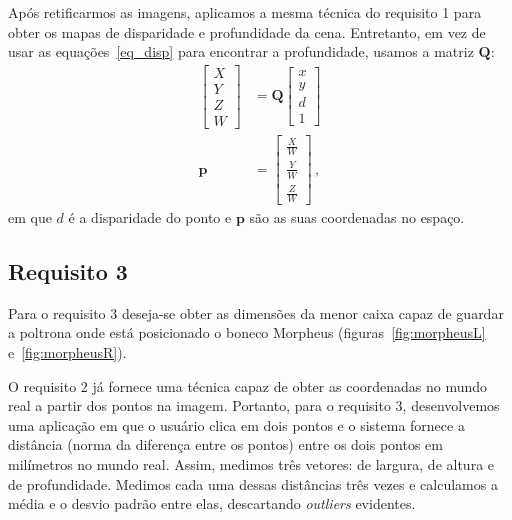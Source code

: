 \documentclass{bmvc2k}
\begin{document}
Após retificarmos as imagens, aplicamos a mesma técnica do requisito 1 para obter os mapas de disparidade e profundidade da cena. Entretanto, em vez de usar as equações~\ref{eq_disp} para encontrar a profundidade, usamos a matriz $\mathbf{Q}$:
\begin{subequations}
    \begin{align}
    \begin{bmatrix}
    X \\
    Y  \\
    Z \\
    W
    \end{bmatrix}
    &=
    \mathbf{Q}\begin{bmatrix}
    x \\
    y  \\
    d\\
    1
    \end{bmatrix}\\
    \bm{p} &= \begin{bmatrix}
    \frac{X}{W} \\
    \frac{Y}{W}  \\
    \frac{Z}{W} 
    \end{bmatrix}\,,
    \end{align}
\end{subequations}
em que $d$ é a disparidade do ponto e $\bm{p}$ são as suas coordenadas no espaço.

\subsection{Requisito 3}
\label{met3}
Para o requisito 3 deseja-se obter as dimensões da menor caixa capaz de guardar a poltrona onde está posicionado o boneco Morpheus (figuras~\ref{fig:morpheusL} e~\ref{fig:morpheusR}).

O requisito 2 já fornece uma técnica capaz de obter as coordenadas no mundo real a partir dos pontos na imagem. Portanto, para o requisito 3, desenvolvemos uma aplicação em que o usuário clica em dois pontos e o sistema fornece a distância (norma da diferença entre os pontos) entre os dois pontos em milímetros no mundo real. Assim, medimos três vetores: de largura, de altura e de profundidade. Medimos cada uma dessas distâncias três vezes e calculamos a média e o desvio padrão entre elas, descartando \textit{outliers} evidentes.
\end{document}
